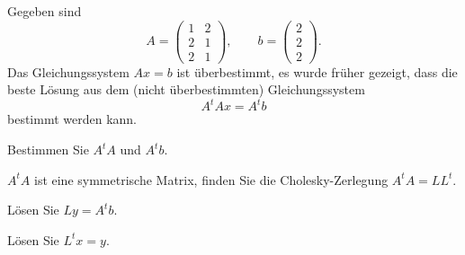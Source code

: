 Gegeben sind
\[
A=\begin{pmatrix}1&2\\2&1\\2&1\end{pmatrix},\qquad
b=\begin{pmatrix}2\\2\\2\end{pmatrix}.
\]
Das Gleichungssystem $Ax=b$ ist überbestimmt, es wurde früher
gezeigt, dass die beste Lösung aus dem (nicht überbestimmten)
Gleichungssystem
\[
A^tAx=A^tb
\]
bestimmt werden kann.
\begin{teilaufgaben}
\item Bestimmen Sie $A^tA$ und $A^tb$.
\item $A^tA$ ist eine symmetrische Matrix, finden Sie die
Cholesky-Zerlegung $A^tA=LL^t$.
\item Lösen Sie $Ly=A^tb$.
\item Lösen Sie $L^tx=y$.
\end{teilaufgaben}

